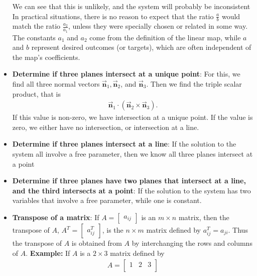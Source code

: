 \documentclass{report}
\begin{document}
\begin{itemize}
            \bigbreak \noindent 
            We can see that this is unlikely, and the system will probably be inconsistent
            \bigbreak \noindent 
            In practical situations, there is no reason to expect that the ratio \( \frac{a}{b} \) would match the ratio \( \frac{a_2}{a_1} \), unless they were specially chosen or related in some way. The constants \( a_1 \) and \( a_2 \) come from the definition of the linear map, while \( a \) and \( b \) represent desired outcomes (or targets), which are often independent of the map's coefficients.
        \item \textbf{Determine if three planes intersect at a unique point}: For this, we find all three normal vectors $\vec{\mathbf{n}}_{1}, \vec{\mathbf{n}}_{2}$, and $\vec{\mathbf{n}}_{3}$. Then we find the triple scalar product, that is
            \begin{align*}
                \vec{\mathbf{n}}_{1} \cdot (\vec{\mathbf{n}}_{2} \times \vec{\mathbf{n}}_{3})
            .\end{align*}
            If this value is non-zero, we have intersection at a unique point. If the value is zero, we either have no intersection, or intersection at a line.
        \item \textbf{Determine if three planes intersect at a line}: If the solution to the system all involve a free parameter, then we know all three planes intersect at a point
        \item \textbf{Determine if three planes have two planes that intersect at a line, and the third intersects at a point}: If the solution to the system has two variables that involve a free parameter, while one is constant. 
        \item \textbf{Transpose of a matrix}:
            If  $A = \begin{bmatrix} a_{ij} \end{bmatrix}$ is an  $m \times n$  matrix, then the transpose of $A$,  $A^T = \begin{bmatrix} a_{ij}^T \end{bmatrix}$, is the $n \times m$  matrix defined by  $a_{ij}^T = a_{ji}$. Thus the transpose of $A$ is obtained from  $A$ by interchanging the rows and columns of $A$.
            \bigbreak \noindent 
            \textbf{Example:} If $A$ is a $2 \times  3$ matrix defined by 
            \begin{align*}
                A = 
                \begin{bmatrix}
                    1 & 2 & 3 \\

\end{bmatrix}
\end{align*}
\end{itemize}
\end{document}
